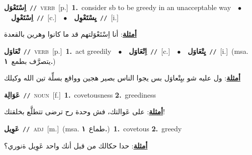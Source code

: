 \documentclass[10pt,a4paper,twoside]{article} %
\begin{document}
\begin{multicols}{2}
{\setlength\topsep{0pt}\textbf{\foreignlanguage{arabic}{اِسْتَعْوَل}}\ {\color{gray}\texttt{//}\color{black}}\ \textsc{verb}\ [p.]\ \textbf{1.}~consider sb to be greedy in an unacceptable way\ \ $\bullet$\ \ \setlength\topsep{0pt}\textbf{\foreignlanguage{arabic}{اِسْتَعْوِل}}\ {\color{gray}\texttt{//}\color{black}}\ [c.]\ \ $\bullet$\ \ \setlength\topsep{0pt}\textbf{\foreignlanguage{arabic}{يِسْتَعْوِل}}\ {\color{gray}\texttt{//}\color{black}}\ [i.]\  \begin{flushright}\color{gray}\foreignlanguage{arabic}{\textbf{\underline{\foreignlanguage{arabic}{أمثلة}}}: أنا اِسْتَعْوَلتهم قد ما كانوا وهرين بالقعدة}\end{flushright}\color{black}} \vspace{2mm}

{\setlength\topsep{0pt}\textbf{\foreignlanguage{arabic}{تْعَاوَل}}\ {\color{gray}\texttt{//}\color{black}}\ \textsc{verb}\ [p.]\ \textbf{1.}~act greedily\ \ $\bullet$\ \ \setlength\topsep{0pt}\textbf{\foreignlanguage{arabic}{اِتْعَاوَل}}\ {\color{gray}\texttt{//}\color{black}}\ [c.]\ \ $\bullet$\ \ \setlength\topsep{0pt}\textbf{\foreignlanguage{arabic}{يِتْعَاوَل}}\ {\color{gray}\texttt{//}\color{black}}\ [i.]\ \color{gray}(msa. \foreignlanguage{arabic}{يتصرَّف بطمع}~\foreignlanguage{arabic}{\textbf{١.}})\color{black}\  \begin{flushright}\color{gray}\foreignlanguage{arabic}{\textbf{\underline{\foreignlanguage{arabic}{أمثلة}}}: ول عليه شو بيِتْعاوَل بس يجوا الناس بصير هجين وواقع بسلِّة تين الله وكيلك}\end{flushright}\color{black}} \vspace{2mm}

{\setlength\topsep{0pt}\textbf{\foreignlanguage{arabic}{عَوَالِة}}\ {\color{gray}\texttt{//}\color{black}}\ \textsc{noun}\ [f.]\ \textbf{1.}~covetousness  \textbf{2.}~greediness\  \begin{flushright}\color{gray}\foreignlanguage{arabic}{\textbf{\underline{\foreignlanguage{arabic}{أمثلة}}}: على عَوالتك، فش وحدة رح ترضى تتطلَّع بخلقتك!}\end{flushright}\color{black}} \vspace{2mm}

{\setlength\topsep{0pt}\textbf{\foreignlanguage{arabic}{عَوِيل}}\ {\color{gray}\texttt{//}\color{black}}\ \textsc{adj}\ [m.]\ \color{gray}(msa. \foreignlanguage{arabic}{طماع}~\foreignlanguage{arabic}{\textbf{١.}})\color{black}\ \textbf{1.}~covetous  \textbf{2.}~greedy\  \begin{flushright}\color{gray}\foreignlanguage{arabic}{\textbf{\underline{\foreignlanguage{arabic}{أمثلة}}}: حدا حكالك من قبل أنك واحد عَوِيل ةنوري؟}\end{flushright}\color{black}} \vspace{2mm}


\end{multicols}
\end{document}
